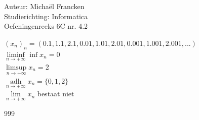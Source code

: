 \documentclass[a4paper]{article}
\begin{document}
\noindent \large Auteur: Michaël Francken \\
\noindent \large Studierichting: Informatica\\
\noindent \large Oefeningenreeks 6C nr. 4.2\\

\medskip

\normalsize

$\left(x_n\right)_n=\left(0.1,1.1,2.1,0.01,1.01,2.01,0.001,1.001,2.001,...\right)$\\

$\liminf\limits_{n\rightarrow+\infty}\inf x_n = 0$\\

$\limsup\limits_{n\rightarrow+\infty} x_n = 2$\\

$\operatorname*{adh}\limits_{n\rightarrow+\infty} x_n= \{0,1,2\}$\\

$\lim\limits_{n\rightarrow+\infty} x_n$ bestaat niet \\

\begin{thebibliography}{999}
\end{thebibliography}
\end{document}

